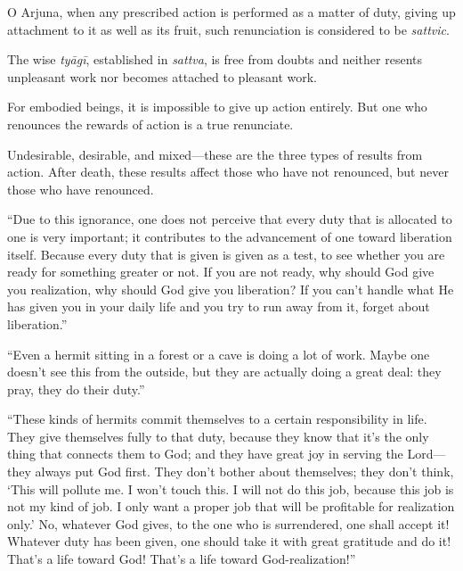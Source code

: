 {O Arjuna, when any prescribed action is performed as a matter of duty, giving up attachment to it as well as its fruit, such renunciation is considered to be \textit{sattvic}.}

{The wise \textit{tyāgī}, established in \textit{sattva}, is free from doubts and neither resents unpleasant work nor becomes attached to pleasant work.}

{For embodied beings, it is impossible to give up action entirely. But one who renounces the rewards of action is a true renunciate.}

{Undesirable, desirable, and mixed---these are the three types of results from action. After death, these results affect those who have not renounced, but never those who have renounced.}

\enquote{Due to this ignorance, one does not perceive that every duty that is allocated to one is very important; it contributes to the advancement of one toward liberation itself. Because every duty that is given is given as a test, to see whether you are ready for something greater or not. If you are not ready, why should God give you realization, why should God give you liberation? If you can’t handle what He has given you in your daily life and you try to run away from it, forget about liberation.}

\enquote{Even a hermit sitting in a forest or a cave is doing a lot of work. Maybe one doesn’t see this from the outside, but they are actually doing a great deal: they pray, they do their duty.}

\enquote{These kinds of hermits commit themselves to a certain responsibility in life. They give themselves fully to that duty, because they know that it’s the only thing that connects them to God; and they have great joy in serving the Lord---they always put God first. They don’t bother about themselves; they don’t think, \enquote{This will pollute me. I won’t touch this. I will not do this job, because this job is not my kind of job. I only want a proper job that will be profitable for realization only.} No, whatever God gives, to the one who is surrendered, one shall accept it! Whatever duty has been given, one should take it with great gratitude and do it! That’s a life toward God! That’s a life toward God-realization!}

